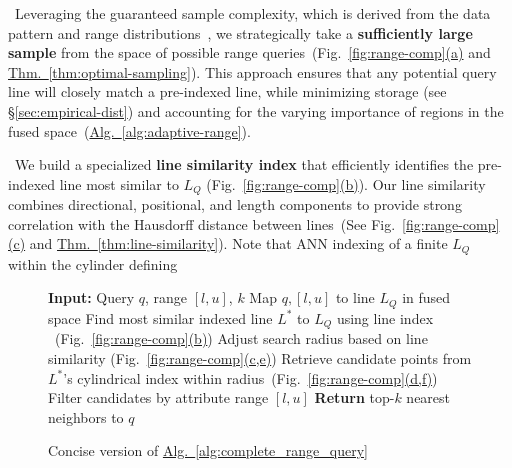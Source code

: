 \documentclass[numbers,sort]{article}
\newcommand{\circled}[1]{%
  \tikz[baseline=(char.base)]{%
    \node[shape=circle, draw, thick, inner sep=0.75pt] (char) {#1};%
  }%
}
\begin{document}
\circled{1}~Leveraging the guaranteed sample complexity, which is derived from the data pattern and range distributions~\cite{livshits2020approximate,heidari2020sampling}, we strategically take a \textbf{sufficiently large sample} from the space of possible range queries~(Fig.~\hyperref[fig:range-comp]{\ref*{fig:range-comp}(a)} and \hyperref[thm:optimal-sampling]{Thm.~\ref*{thm:optimal-sampling}}). This approach ensures that any potential query line will closely match a pre-indexed line, while minimizing storage (see \hyperref[sec:empirical-dist]{\S\ref*{sec:empirical-dist}}) and accounting for the varying importance of regions in the fused space~(\hyperref[alg:adaptive-range]{Alg.~\ref*{alg:adaptive-range}}). 

\circled{2}~We build a specialized \textbf{line similarity index} that efficiently identifies the pre-indexed line most similar to $L_Q$ (Fig.~\hyperref[fig:range-comp]{\ref*{fig:range-comp}(b)}). Our line similarity combines directional, positional, and length components to provide strong correlation with the Hausdorff distance between lines~(See Fig.~\hyperref[fig:range-comp]{\ref*{fig:range-comp}(c)} and \hyperref[thm:line-similarity]{Thm.~\ref*{thm:line-similarity}}). Note that ANN indexing of a finite $L_Q$ within the cylinder defining\begin{figure}
  \vspace{-10pt}
  \begin{minipage}{0.44\textwidth}
    \begin{algorithm}[H]
    \small
      \caption{Concise version of \hyperref[alg:complete_range_query]{Alg.~\ref*{alg:complete_range_query}}}
      \label{alg:hierarchical_range_query_concise}
      \begin{algorithmic}[1]
        \STATE \textbf{Input:} Query $q$, range $[l, u]$, $k$
        \STATE Map $q, [l,u]$ to line $L_Q$ in fused space
        \STATE Find most similar indexed line $L^*$ to $L_Q$ using line index ~(Fig.~\hyperref[fig:range-comp]{\ref*{fig:range-comp}(b)})
        \STATE Adjust search radius based on line similarity (Fig.~\hyperref[fig:range-comp]{\ref*{fig:range-comp}(c,e)})
        \STATE Retrieve candidate points from $L^*$'s cylindrical index within radius~(Fig.~\hyperref[fig:range-comp]{\ref*{fig:range-comp}(d,f)})
        \STATE Filter candidates by attribute range $[l,u]$
        \STATE \textbf{Return} top-$k$ nearest neighbors to $q$
      \end{algorithmic}
    \end{algorithm}
  \end{minipage}

\end{figure}
\end{document}
